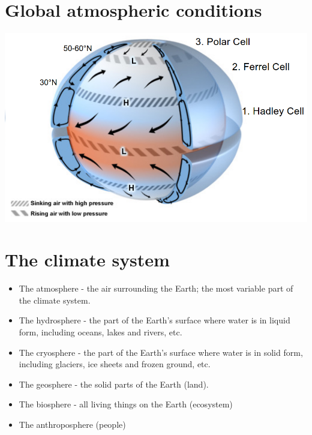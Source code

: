 \documentclass[11pt]{article}
\begin{document}
\section{Global atmospheric conditions}
\label{sec:orgbebf0f9}
\begin{center}
\includegraphics[width=.9\linewidth]{./images/global-atmospheric-circulations.png}
\end{center}

\section{The climate system}
\label{sec:org9184c3c}
\begin{itemize}
\item The atmosphere - the air surrounding the Earth; the most variable part of the climate system.
\item The hydrosphere - the part of the Earth's surface where water is in liquid form, including oceans, lakes and rivers, etc.
\item The cryosphere - the part of the Earth's surface where water is in solid form, including glaciers, ice sheets and frozen ground, etc.
\item The geosphere - the solid parts of the Earth (land).
\item The biosphere - all living things on the Earth (ecosystem)
\item The anthroposphere (people)
\end{itemize}

\newpage
\end{document}
